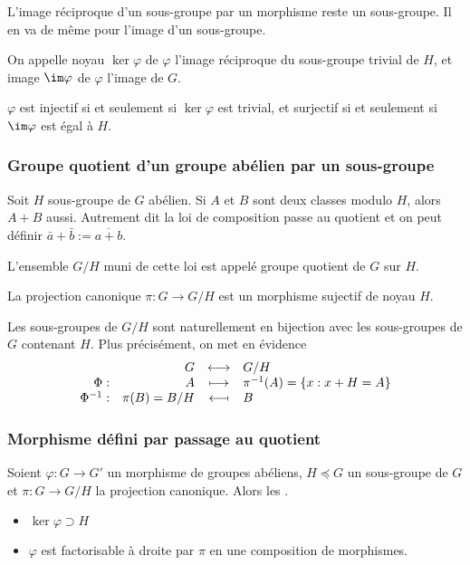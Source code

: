 \documentclass[a4paper,11pt,twocolumn]{article}\usepackage[landscape]{geometry}
\begin{document}
       L'image réciproque d'un sous-groupe par un morphisme reste un sous-groupe. Il en va de même pour l'image d'un sous-groupe.

       On appelle noyau $\ker\varphi$ de $\varphi$ l'image réciproque du sous-groupe trivial de $H$, et image $\im\varphi$ de $\varphi$ l'image de $G$.

       $\varphi$ est injectif si et seulement si $\ker\varphi$ est trivial, et surjectif si et seulement si $\im\varphi$ est égal à $H$.

    \subsubsection{Groupe quotient d'un groupe abélien par un sous-groupe}

       Soit $H$ sous-groupe de $G$ abélien. Si $A$ et $B$ sont deux classes modulo $H$, alors $A+B$ aussi. Autrement dit la loi de composition passe au quotient et on peut définir $\bar{a}+\bar{b} := \overline{a+b}$.

       L'ensemble $G/H$ muni de cette loi est appelé groupe quotient de $G$ sur $H$.

       La projection canonique $\pi:G\rightarrow G/H$ est un morphisme sujectif de noyau $H$.

       Les sous-groupes de $G/H$ sont naturellement en bijection avec les sous-groupes de $G$ contenant $H$. Plus précisément, on met en évidence
      \[\begin{array}{rrcl}
          {}&G&\longleftrightarrow&G/H\\
          \Phi:&A&\longmapsto&\pi^{-1}(A) = \{x: x+H = A\}\\
          \Phi^{-1}:&\pi(B) = B/H&\reflectbox{$\longmapsto$}&B
      \end{array}\]

    \subsubsection{Morphisme défini par passage au quotient}

       Soient $\varphi:G\rightarrow G'$ un morphisme de groupes abéliens, $H\preccurlyeq G$ un sous-groupe de $G$ et $\pi:G\rightarrow G/H$ la projection canonique. Alors les \Asse{}.
      \begin{itemize}
        \item $\ker\varphi\supset H$
        \item $\varphi$ est factorisable à droite par $\pi$ en une composition de morphismes.
      \end{itemize}
\end{document}
